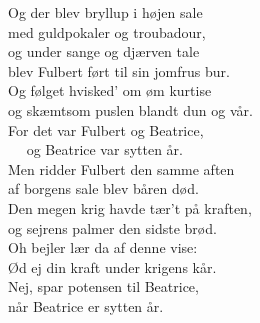 Og der blev bryllup i højen sale\\
med guldpokaler og troubadour,\\
og under sange og djærven tale\\
blev Fulbert ført til sin jomfrus bur.\\
Og følget hvisked' om øm kurtise\\
og skæmtsom puslen blandt dun og vår.\\
For det var Fulbert og Beatrice,\\  
og Beatrice var sytten år.\\


Men ridder Fulbert den samme aften\\
af borgens sale blev båren død.\\
Den megen krig havde tær't på kraften,\\
og sejrens palmer den sidste brød.\\
Oh bejler lær da af denne vise:\\
Ød ej din kraft under krigens kår.\\
Nej, spar potensen til Beatrice,\\
når Beatrice er sytten år.


